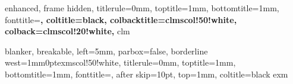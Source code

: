

{
    enhanced,
    frame hidden,
    titlerule=0mm,
    toptitle=1mm,
    bottomtitle=1mm,
    fonttitle=\bfseries\large,
    coltitle=black,
    colbacktitle=clmscol!50!white,
    colback=clmscol!20!white,
}{clm}


\newenvironment{clmpf}{
	{\noindent{\it \textbf{Proof.}}
	\setlength{\parindent}{0pt}
	}
	\tcolorbox[blanker,breakable,left=5mm,parbox=false,
    before upper={\parindent15pt},
    after skip=10pt,
	borderline west={1mm}{0pt}{clmscol!50!white}]
}{
    \textcolor{clmscol!50!white}{\hbox{}\nobreak\hfill$\blacksquare$} 
    \endtcolorbox
}

\NewDocumentCommand{\clmp}{m+m+m}{
    \begin{claim*}{#1}{}
        #2
    \end{claim*}

    \begin{clmpf}
        #3
    \end{clmpf}
}





{
    blanker,
    breakable,
    left=5mm,
    parbox=false,
	borderline west={1mm}{0pt}{exmscol!50!white},
    titlerule=0mm,
    toptitle=1mm,
    bottomtitle=1mm,
    fonttitle={\bfseries\itshape},
    after skip=10pt,
    top=1mm,
    coltitle=black
}{exm}

